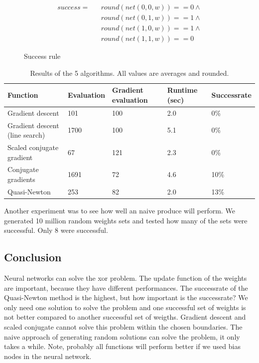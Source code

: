 \documentclass{article}
\begin{document}
\begin{figure}[H]
	\centering
	\begin{eqnarray}
		success =&& round(net(0, 0, w)) == 0 \wedge \\
				&& round(net(0, 1, w)) == 1 \wedge \\
				&& round(net(1, 0, w)) == 1 \wedge \\
			&& round(net(1, 1, w)) == 0
	\end{eqnarray}
	\caption{Success rule}
	\label{fig:sr}
\end{figure}



\newpage
\begin{table}[H]
	\centering
	\begin{tabular}{| l | l | l | l | l |}
		\hline
		Function & Evaluation & Gradient evaluation & Runtime (sec) & Successrate \\ \hline
		Gradient descent & 101 & 100 & 2.0 & 0\% \\ \hline
		Gradient descent (line search) & 1700 & 100 & 5.1 & 0\% \\ \hline
		Scaled conjugate gradient & 67 & 121 & 2.3 & 0\% \\ \hline
		Conjugate gradients & 1691 & 72 & 4.6 & 10\% \\ \hline
		Quasi-Newton & 253 & 82 & 2.0 & 13\% \\ \hline
	\end{tabular}
	\caption{Results of the 5 algorithms. All values are averages and rounded.}
	\label{table:results}
\end{table}

Another experiment was to see how well an naive produce will perform. We generated 10 million random weights sets and tested how many of the sets were successful. Only 8 were successful. 

\subsection{Conclusion}
Neural networks can solve the xor problem. The update function of the weights are important, because they have different performances. The successrate of the Quasi-Newton method is the highest, but how important is the successrate? We only need one solution to solve the problem and one successful set of weights is not better compared to another successful set of weigths. Gradient descent and scaled conjugate cannot solve this problem within the chosen boundaries. The naive approach of generating random solutions can solve the problem, it only takes a while. Note, probably all functions will perform better if we used bias nodes in the neural network.
\end{document}
